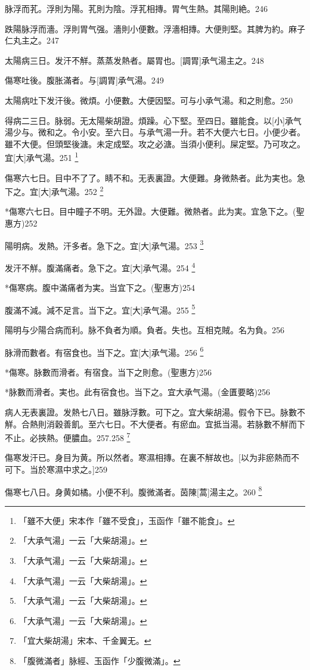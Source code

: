 \documentclass[12pt,twoside,UTF8,b5paper]{ctexbook}
\begin{document}
脉浮而芤。浮則为陽。芤則为陰。浮芤相摶。胃气生熱。其陽則絶。246

跌陽脉浮而濇。浮則胃气强。濇則小便數。浮濇相摶。大便則堅。其脾为約。麻子仁丸主之。247

太陽病三日。发汗不觧。蒸蒸发熱者。屬胃也。[調胃]承气湯主之。248

傷寒吐後。腹胀滿者。与[調胃]承气湯。249

太陽病吐下发汗後。微煩。小便數。大便因堅。可与小承气湯。和之則愈。250

得病二三日。脉弱。无太陽柴胡證。煩躁。心下堅。至四日。雖能食。以[小]承气湯少与。微和之。令小安。至六日。与承气湯一升。若不大便六七日。小便少者。雖不大便。但頭堅後溏。未定成堅。攻之必溏。当須小便利。屎定堅。乃可攻之。宜[大]承气湯。251
	\footnote{「雖不大便」宋本作「雖不受食」，玉函作「雖不能食」。}

傷寒六七日。目中不了了。睛不和。无表裏證。大便難。身微熱者。此为実也。急下之。宜[大]承气湯。252
	\footnote{「大承气湯」一云「大柴胡湯」。}

*傷寒六七日。目中瞳子不明。无外證。大便難。微熱者。此为実。宜急下之。(聖惠方)252

陽明病。发熱。汗多者。急下之。宜[大]承气湯。253
	\footnote{「大承气湯」一云「大柴胡湯」。}

发汗不觧。腹滿痛者。急下之。宜[大]承气湯。254
	\footnote{「大承气湯」一云「大柴胡湯」。}

*傷寒病。腹中滿痛者为実。当宜下之。(聖惠方)254

腹滿不減。減不足言。当下之。宜[大]承气湯。255
	\footnote{「大承气湯」一云「大柴胡湯」。}

陽明与少陽合病而利。脉不負者为順。負者。失也。互相克賊。名为負。256

脉滑而數者。有宿食也。当下之。宜[大]承气湯。256
	\footnote{「大承气湯」一云「大柴胡湯」。}

*傷寒。脉數而滑者。有宿食。当下之則愈。(聖惠方)256

*脉數而滑者。実也。此有宿食也。当下之。宜大承气湯。(金匱要略)256

病人无表裏證。发熱七八日。雖脉浮數。可下之。宜大柴胡湯。假令下已。脉數不觧。合熱則消穀善飢。至六七日。不大便者。有瘀血。宜抵当湯。若脉數不觧而下不止。必挾熱。便膿血。257.258
	\footnote{「宜大柴胡湯」宋本、千金翼无。}

傷寒发汗已。身目为黄。所以然者。寒濕相摶。在裏不觧故也。[以为非瘀熱而不可下。当於寒濕中求之。]259

傷寒七八日。身黄如橘。小便不利。腹微滿者。茵陳[蒿]湯主之。260
	\footnote{「腹微滿者」脉經、玉函作「少腹微滿」。}
\end{document}
